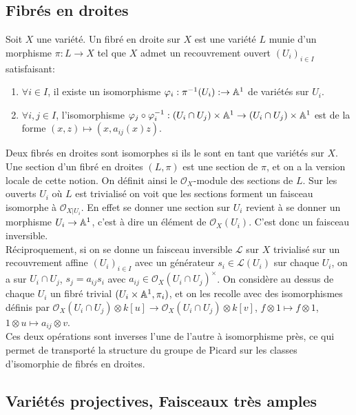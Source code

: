\subsection{Fibrés en droites}

Soit $X$ une variété. Un fibré en droite sur $X$ est une variété $L$ munie d'un morphisme $\pi:L\rightarrow X$ tel que $X$ admet un recouvrement ouvert $(U_i)_{i\in I}$ satisfaisant:

\begin{enumerate}
\item $\forall i\in I$, il existe un isomorphisme $\varphi_i :\pi^{-1}(U_i):\rightarrow \mathbb{A}^1$ de variétés sur $U_i$.
\item $\forall i, j\in I$, l'isomorphisme $\varphi_j\circ \varphi_i^{-1}: (U_i\cap U_j)\times \mathbb{A}^1\rightarrow (U_i\cap U_j)\times \mathbb{A}^1$ est de la forme $(x, z)\mapsto (x, a_{ij}(x)z)$.
\end{enumerate}

Deux fibrés en droites sont isomorphes si ils le sont en tant que variétés sur $X$. Une section d'un fibré en droites $(L, \pi)$ est une section de $\pi$, et on a la version locale de cette notion. On définit ainsi le $\mathcal{O}_X$-module des sections de $L$. Sur les ouverts $U_i$ où $L$ est trivialisé on voit que les sections forment un faisceau isomorphe à $\mathcal{O}_{X|U_i}$. En effet se donner une section sur $U_i$ revient à se donner un morphisme $U_i\rightarrow \mathbb{A}^1$, c'est à dire un élément de $\mathcal{O}_X(U_i)$. C'est donc un faisceau inversible.\\
Réciproquement, si on se donne un faisceau inversible $\mathcal{L}$ sur $X$ trivialisé sur un recouvrement affine $(U_i)_{i\in I}$ avec un générateur $s_i\in\mathcal{L}(U_i)$ sur chaque $U_i$, on a sur $U_i\cap U_j$, $s_j=a_{ij}s_i$ avec $a_{ij} \in \mathcal{O}_X(U_i\cap U_j)^\times$. On considère au dessus de chaque $U_i$ un fibré trivial $(U_i\times\mathbb{A}^1, \pi_i)$, et on les recolle avec des isomorphismes définis par $\mathcal{O}_X(U_i\cap U_j)\otimes k[u]\rightarrow \mathcal{O}_X(U_i\cap U_j)\otimes k[v]$, $f\otimes 1\mapsto f\otimes 1$, $1 \otimes u \mapsto a_{ij}\otimes v$.\\
Ces deux opérations sont inverses l'une de l'autre à isomorphisme près, ce qui permet de transporté la structure du groupe de Picard sur les classes d'isomorphie de fibrés en droites.

\subsection{Variétés projectives, Faisceaux très amples}

